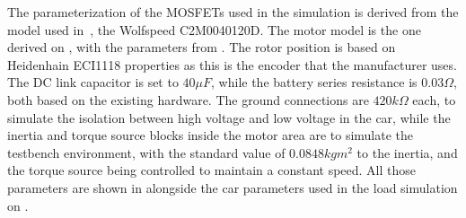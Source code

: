 The parameterization of the MOSFETs used in the simulation is derived from the model used in~\cite{Costa:MSc}, the  Wolfspeed C2M0040120D. The motor model is the one derived on , with the parameters from . The rotor position is based on Heidenhain ECI1118 properties as this is the encoder that the manufacturer uses. 
The DC link capacitor is set to $40\mu F$, while the battery series resistance is $0.03 \Omega$, both based on the existing hardware. The ground connections are $420k\Omega$ each, to simulate the isolation between high voltage and low voltage in the car, while the inertia and torque source blocks inside the motor area are to simulate the testbench environment, with the standard value of $0.0848 kg m^2$ to the inertia, and the torque source being controlled to maintain a constant speed. All those parameters are shown in  alongside the car parameters used in the load simulation on .

